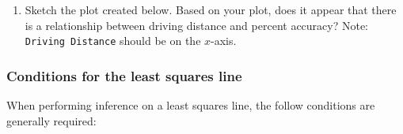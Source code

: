 \documentclass[
]{report}
\providecommand{\tightlist}{%
  \setlength{\itemsep}{0pt}\setlength{\parskip}{0pt}}
\begin{document}
\newpage

\begin{enumerate}
\def\labelenumi{\arabic{enumi}.}
\tightlist
\item
  Sketch the plot created below. Based on your plot, does it appear that there is a relationship between driving distance and percent accuracy? Note: \texttt{Driving\ Distance} should be on the \(x\)-axis.
\end{enumerate}

\vspace{2in}

\hypertarget{conditions-for-the-least-squares-line}{%
\subsubsection*{Conditions for the least squares line}\label{conditions-for-the-least-squares-line}}

When performing inference on a least squares line, the follow conditions are generally required:
\end{document}
